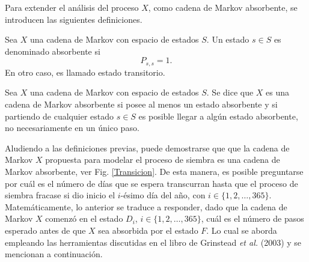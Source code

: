 Para extender el análisis del proceso $X$, como cadena de Markov absorbente, se introducen las siguientes definiciones.\\

\begin{definition}
	Sea $X$ una cadena de Markov con espacio de estados $S.$
	Un estado $s\in S$ es denominado absorbente si \begin{equation}
		P_{s,s}=1.
	\end{equation}En otro caso, es llamado estado transitorio. 
\end{definition}

\begin{definition}
	Sea $X$ una cadena de Markov con espacio de estados $S$. Se dice que $X$ es una cadena de Markov absorbente si posee al menos un estado absorbente y si partiendo de cualquier estado $s\in S$ es posible llegar a algún estado absorbente, no necesariamente en un único paso.
\end{definition}

Aludiendo a las definiciones previas, puede demostrarse que que la cadena de Markov $X$ propuesta para modelar el proceso de siembra es una cadena de Markov absorbente, ver Fig. \ref{Transicion}. De esta manera, es posible preguntarse por cuál es el número de días que se espera transcurran hasta que el proceso de siembra fracase si dio inicio el $i$-ésimo día del año, con $i\in\{1,2,\ldots,365\}$.\\


Matemáticamente, lo anterior se traduce a responder, dado que la cadena de Markov $X$ comenzó en el estado $D_{i}$, $i\in\{1,2,\ldots,365\}$, cuál es el número de pasos esperado antes de que $X$ sea absorbida por el estado $F$. Lo cual se aborda empleando las herramientas discutidas en el libro de Grinstead \textit{et al.} (2003) \cite[Capítulo 11]{Grinstead_2003} y se mencionan a continuación.\\


